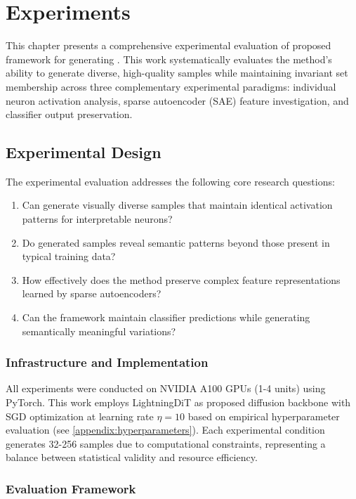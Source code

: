 \chapter{Experiments}\label{r:experiments}

This chapter presents a comprehensive experimental evaluation of proposed \method{} framework for generating \framework{}. This work systematically evaluates the method's ability to generate diverse, high-quality samples while maintaining invariant set membership across three complementary experimental paradigms: individual neuron activation analysis, sparse autoencoder (SAE) feature investigation, and classifier output preservation.

\section{Experimental Design}

The experimental evaluation addresses the following core research questions:
\begin{enumerate}
\item Can \method{} generate visually diverse samples that maintain identical activation patterns for interpretable neurons?
\item Do generated samples reveal semantic patterns beyond those present in typical training data?
\item How effectively does the method preserve complex feature representations learned by sparse autoencoders?
\item Can the framework maintain classifier predictions while generating semantically meaningful variations?
\end{enumerate}

\subsection{Infrastructure and Implementation}

All experiments were conducted on NVIDIA A100 GPUs (1-4 units) using PyTorch. This work employs LightningDiT as proposed diffusion backbone with SGD optimization at learning rate $\eta = 10$ based on empirical hyperparameter evaluation (see \cref{appendix:hyperparameters}). Each experimental condition generates 32-256 samples due to computational constraints, representing a balance between statistical validity and resource efficiency.

\subsection{Evaluation Framework}

